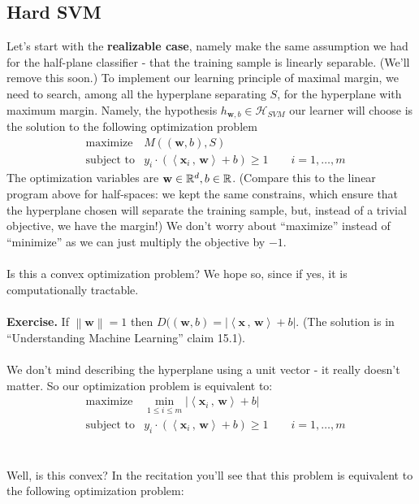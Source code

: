 \documentclass[11pt]{article}
\newcommand{\norm}[1]{\left\| #1\right\|}
\newcommand{\Hc}{\mathcal{H}}
\newcommand{\innerr}[2]{{\left\langle #1\,,\,#2 \right\rangle}}
\newcommand{\VV}[1]{\mathbf{#1}}
\begin{document}
 \subsection{Hard SVM}
 Let's start with the {\bf realizable case}, namely make the same assumption we
 had for the half-plane classifier - that the training sample is linearly
 separable. (We'll remove this soon.)
 To implement our learning principle of maximal margin, we need to search, among
 all the hyperplane separating $S$, for the hyperplane with maximum margin. 
 Namely, the hypothesis $h_{\VV{w},b} \in
 \Hc_{SVM}$ our learner will choose is the solution to the following
 optimization problem
  \begin{eqnarray*}
      & \text{maximize}   &  M( (\VV{w},b) , S) \\
     & \text{subject to} &  y_i \cdot \left( \innerr{\VV{x}_i}{\VV{w}}
      +b \right) \geq 1  \qquad 
i=1,\ldots,m
    \end{eqnarray*}
    The optimization variables are $\VV{w}\in\reals^d,b\in\reals$. (Compare this
      to the linear program above for half-spaces: we kept the same constrains,
      which ensure that the hyperplane chosen will separate the training sample,
    but, instead of a trivial objective, we have the margin!) We don't worry
    about ``maximize'' instead of ``minimize'' as we can just multiply the
    objective by $-1$. 
\\~\\
Is this a convex optimization problem? We hope so, since if yes, it is
computationally tractable. 
\\~\\
{\bf Exercise.} If $\norm{\VV{w}}=1$ then $ D( (\VV{w},b) = 
  |\innerr{\VV{x}}{\VV{w}}+b|$.  (The solution is in ``Understanding Machine
  Learning'' claim 15.1).
\\~\\
We don't mind describing the hyperplane using a unit vector - it really doesn't
matter. So our optimization problem is equivalent to:
\begin{eqnarray*}
  & \text{maximize}   &  \min_{1\leq i\leq m} |\innerr{\VV{x}_i}{\VV{w}}+b| \\
     & \text{subject to} &  y_i \cdot \left( \innerr{\VV{x}_i}{\VV{w}}
      +b \right) \geq 1  \qquad 
i=1,\ldots,m
    \end{eqnarray*}
    \\~\\ Well, is this convex? In the recitation you'll see that this problem
    is equivalent to the following optimization problem:
\end{document}
